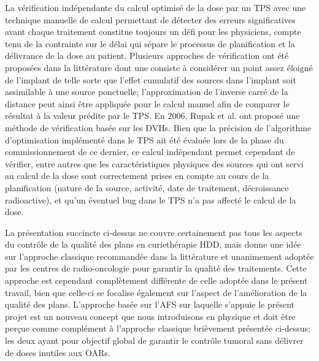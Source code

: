 \begin{itemize}[label=\textbullet, font=\LARGE]
La vérification indépendante du calcul optimisé de la dose par un TPS avec une technique manuelle de calcul permettant de détecter des erreurs significatives avant chaque traitement constitue toujours un défi pour les physiciens, compte tenu de la contrainte sur le délai qui sépare le processus de planification et la délivrance de la dose au patient. Plusieurs approches de vérification ont été proposées dans la littérature \cite{Thomadsen@1992, Kubo@1992, Saw@1998} dont une consiste à considérer un point assez éloigné de l’implant de telle sorte que l’effet cumulatif des sources dans l’implant soit assimilable à une source ponctuelle; l’approximation de l’inverse carré de la distance peut ainsi être appliquée pour le calcul manuel afin de comparer le résultat à la valeur prédite par le TPS. En 2006, Rupak et al.\cite{Rupak@2006} ont proposé une méthode de vérification basée sur les DVHs. Bien que la précision de l’algorithme d’optimisation implémenté dans le TPS ait été évaluée lors de la phase du commissionnement de ce dernier, ce calcul indépendant permet cependant de vérifier, entre autres que les caractéristiques physiques des sources qui ont servi au calcul de la dose sont correctement prises en compte au cours de la planification (nature de la source, activité, date de traitement, décroissance radioactive), et qu’un éventuel bug dans le TPS n'a pas affecté le calcul de la dose.
\end{itemize}
%
La présentation succincte ci-dessus ne couvre certainement pas tous les aspects du contrôle de la qualité des plans en curiethérapie HDD, mais donne une idée sur l’approche classique recommandée dans la littérature et unanimement adoptée par les centres de radio-oncologie pour garantir la qualité des traitements. Cette approche est cependant complètement différente de celle adoptée dans le présent travail, bien que celle-ci se focalise également sur l’aspect de l’amélioration de la qualité des plans. L’approche basée sur l’AFS sur laquelle s’appuie le présent projet est un nouveau concept que nous introduisons en physique et doit être perçue comme complément à l’approche classique brièvement présentée ci-dessus; les deux ayant pour objectif global de garantir le contrôle tumoral sans délivrer de doses inutiles aux OARs.
%
